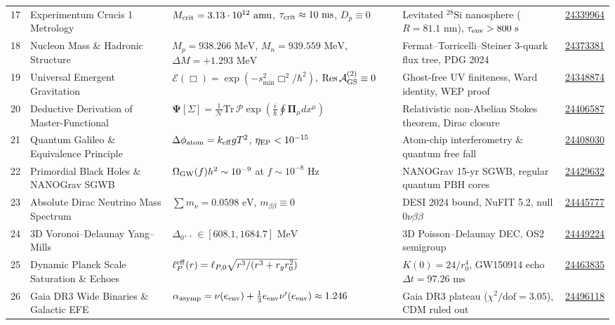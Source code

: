 \documentclass[11pt,a4paper]{article}
\theoremstyle{definition}
\begin{document}
\begin{small}
\begin{longtable}{p{} p{} p{} p{} p{}}
17 & Experimentum Crucis 1 Metrology & $M_{\rm crit} = 3.13 \cdot 10^{12}\text{ amu}$, $\tau_{\rm crit} \approx 10\text{ ms}$, $D_p \equiv 0$ & Levitated $^{28}\text{Si}$ nanosphere ($R=81.1\text{ nm}$), $\tau_{\rm env} > 800\text{ s}$ & \href{https://doi.org/10.5281/zenodo.24339964}{24339964} \\
18 & Nucleon Mass \& Hadronic Structure & $M_p = 938.266\text{ MeV}$, $M_n = 939.559\text{ MeV}$, $\Delta M = +1.293\text{ MeV}$ & Fermat--Torricelli--Steiner 3-quark flux tree, PDG 2024 & \href{https://doi.org/10.5281/zenodo.24373381}{24373381} \\
19 & Universal Emergent Gravitation & $\mathcal{E}(\Box) = \exp(-s_{\min}^2 \Box^2/\hbar^2)$, $\text{Res}\,\mathcal{A}_{\rm GS}^{(2)} \equiv 0$ & Ghost-free UV finiteness, Ward identity, WEP proof & \href{https://doi.org/10.5281/zenodo.24348874}{24348874} \\
20 & Deductive Derivation of Master-Functional & $\mathbf{\Psi}[\Sigma] = \frac{1}{\mathcal{N}}\mathrm{Tr}\,\mathcal{P}\exp(\frac{i}{\hbar}\oint \mathbf{\Pi}_\mu dx^\mu)$ & Relativistic non-Abelian Stokes theorem, Dirac closure & \href{https://doi.org/10.5281/zenodo.24406587}{24406587} \\
21 & Quantum Galileo \& Equivalence Principle & $\Delta\phi_{\rm atom} = k_{\rm eff} g T^2$, $\eta_{\rm EP} < 10^{-15}$ & Atom-chip interferometry \& quantum free fall & \href{https://doi.org/10.5281/zenodo.24408030}{24408030} \\
22 & Primordial Black Holes \& NANOGrav SGWB & $\Omega_{\rm GW}(f) h^2 \sim 10^{-9}$ at $f \sim 10^{-8}\text{ Hz}$ & NANOGrav 15-yr SGWB, regular quantum PBH cores & \href{https://doi.org/10.5281/zenodo.24429632}{24429632} \\
23 & Absolute Dirac Neutrino Mass Spectrum & $\sum m_\nu = 0.0598\text{ eV}$, $m_{\beta\beta} \equiv 0$ & DESI 2024 bound, NuFIT 5.2, null $0\nu\beta\beta$ & \href{https://doi.org/10.5281/zenodo.24445777}{24445777} \\
24 & 3D Voronoi--Delaunay Yang--Mills & $\Delta_{0^{++}} \in [608.1, 1684.7]\text{ MeV}$ & 3D Poisson--Delaunay DEC, OS2 semigroup & \href{https://doi.org/10.5281/zenodo.24449224}{24449224} \\
25 & Dynamic Planck Scale Saturation \& Echoes & $\ell_P^{\rm eff}(r) = \ell_{P,0}\sqrt{r^3/(r^3 + r_g r_0^2)}$ & $K(0) = 24/r_0^4$, GW150914 echo $\Delta t = 97.26\text{ ms}$ & \href{https://doi.org/10.5281/zenodo.24463835}{24463835} \\
26 & Gaia DR3 Wide Binaries \& Galactic EFE & $\alpha_{\rm asymp} = \nu(e_{\rm env}) + \frac{1}{3}e_{\rm env}\nu'(e_{\rm env}) \approx 1.246$ & Gaia DR3 plateau ($\chi^2/\mathrm{dof} = 3.05$), CDM ruled out & \href{https://doi.org/10.5281/zenodo.24496118}{24496118} \\

\end{longtable}
\end{small}
\end{document}
